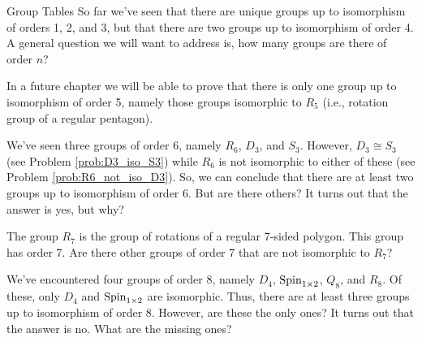 \begin{section}{Group Tables}
So far we've seen that there are unique groups up to isomorphism of orders 1, 2, and 3, but that there are two groups up to isomorphism of order 4.  A general question we will want to address is, how many groups are there of order $n$?

In a future chapter we will be able to prove that there is only one group up to isomorphism of order 5, namely those groups isomorphic to $R_5$ (i.e., rotation group of a regular pentagon).

We've seen three groups of order 6, namely $R_6$, $D_3$, and $S_3$.  However, $D_3\cong S_3$ (see Problem \ref{prob:D3_iso_S3}) while $R_6$ is not isomorphic to either of these (see Problem \ref{prob:R6_not_iso_D3}).  So, we can conclude that there are at least two groups up to isomorphism of order 6.   But are there others?  It turns out that the answer is yes, but why?

The group $R_7$ is the group of rotations of a regular 7-sided polygon.  This group has order 7.  Are there other groups of order 7 that are not isomorphic to $R_7$? 

We've encountered four groups of order 8, namely $D_4$, $\operatorname{Spin}_{1\times 2}$, $Q_8$, and $R_8$.  Of these, only $D_4$ and $\operatorname{Spin}_{1\times 2}$ are isomorphic.  Thus, there are at least three groups up to isomorphism of order 8.  However, are these the only ones?  It turns out that the answer is no.  What are the missing ones?

\end{section}

